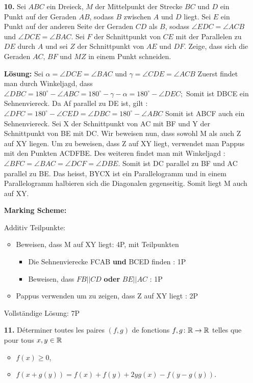 \documentclass[language=german,style=solution]{smo}
\begin{document}
\begin{enumerate}
\newpage


\item[\textbf{10.}] %
Sei $ABC$ ein Dreieck, $M$ der Mittelpunkt der Strecke $BC$ und $D$ ein Punkt auf der Geraden $AB$, sodass $B$ zwischen $A$ und $D$ liegt. Sei $E$ ein Punkt auf der anderen Seite der Geraden $CD$ als $B$, sodass $\angle EDC = \angle ACB$ und $\angle DCE = \angle BAC$. Sei $F$ der Schnittpunkt von $CE$ mit der Parallelen zu $DE$ durch $A$ und sei $Z$ der Schnittpunkt von $AE$ und $DF$. Zeige, dass sich die Geraden $AC$, $BF$ und $MZ$ in einem Punkt schneiden.

\textbf{Lösung:}
Sei $\alpha = \angle DCE = \angle BAC$ und $\gamma = \angle CDE = \angle ACB$
Zuerst findet man durch Winkeljagd, dass $\angle DBC = 180^\circ - \angle ABC = 180 ^\circ - \gamma - \alpha = 180^\circ - \angle DEC;$ Somit ist DBCE ein Sehnenviereck. Da Af parallel zu DE ist, gilt : $\angle DFC = 180^\circ - \angle CED = \angle DBC = 180^\circ - \angle ABC $
Somit ist ABCF auch ein Sehnenviereck. 
Sei X der Schnittpunkt von AC mit BF und Y der Schnittpunkt von BE mit DC. Wir beweisen nun, dass sowohl M als auch Z auf XY liegen. Um zu beweisen, dass Z auf XY liegt, verwendet man Pappus mit den Punkten ACDFBE. 
Des weiteren findet man mit Winkeljagd : $\angle BFC = \angle BAC = \angle DCF = \angle DBE$. Somit ist DC parallel zu BF und AC parallel zu BE. Das heisst, BYCX ist ein Parallelogramm und in einem Parallelogramm halbieren sich die Diagonalen gegenseitig. Somit liegt M auch auf XY. 

\textbf{Marking Scheme:}

Additiv Teilpunkte:
\begin{itemize}
    \item Beweisen, dass M auf XY liegt: 4P, mit Teilpunkten
    \begin{itemize}
    \item Die Sehnenvierecke FCAB \textbf{und} BCED finden : 1P
    \item Beweisen, dass $FB || CD$ \textbf{oder} $BE || AC$ : 1P
    \end{itemize}
    \item Pappus verwenden um zu zeigen, dass Z auf XY liegt : 2P
\end{itemize}

Vollständige Lösung: 7P




\newpage

\item[\textbf{11.}] %
Déterminer toutes les paires $(f,g)$ de fonctions $f,g \colon \mathbb{R} \to \mathbb{R}$ telles que pour tous $x, y \in \mathbb{R}$
\begin{itemize}
\item $f(x)\geq 0$,
\item $f(x+g(y)) = f(x) + f(y) + 2yg(x) - f(y-g(y))$.
\end{itemize}


\end{enumerate}
\end{document}

